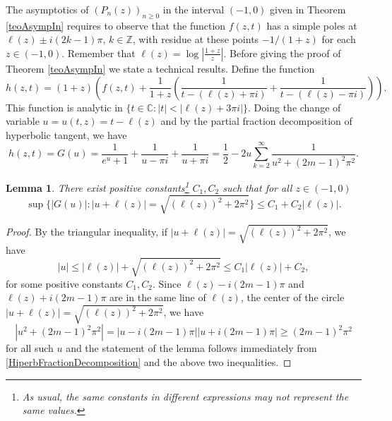\documentclass[11pt]{article}
\newtheorem{lemma}{Lemma}
\newcommand{\Z}{\mathbb{Z}}
\newcommand{\C}{\mathbb{C}}
\begin{document}
The asymptotics of $(P_n(z))_{n\ge 0}$ in the interval $(-1,0)$ given in Theorem \ref{teoAsympIn} requires to observe that the function $f(z,t)$ has a simple poles at $\ell(z)\pm i(2k-1)\pi$, $k\in\Z$, with residue at these points $-1/(1+z)$ for each $z\in (-1,0)$. Remember that $\ell(z)=\log|\frac{1+z}{z}|$. Before giving the proof of Theorem \ref{teoAsympIn} we  state a technical results. Define the function
\[
h(z,t)=(1+z)\left(f(z,t)+\frac{1}{1+z}\left(\frac{1}{t-(\ell(z)+\pi i)}+\frac{1}{t-(\ell(z)-\pi i)}\right)\right).
\]
This function is analytic in $\{t\in\C:|t|<|\ell(z)+3\pi i|\}$. Doing the change of variable $u=u(t,z)=t-\ell(z)$ and by the partial fraction decomposition of hyperbolic tangent, we have
\begin{equation}
\label{HiperbFractionDecomposition}
h(z,t)=G(u)=\frac{1}{e^u+1}+\frac{1}{u-\pi i}+\frac{1}{u+\pi i}=\frac12-2u\sum_{k=2}^\infty\frac{1}{u^2+(2m-1)^2\pi^2}.
\end{equation}
\begin{lemma} \label{lemAcotaFuncSinSingularidad}There exist positive constants\footnote{As usual, the same constants in different expressions may not represent the same values. } $C_1,C_2$ such that for all $z\in(-1,0)$ 
\[
\sup\{|G(u)|:|u+\ell(z)|=\sqrt{(\ell(z))^2+2\pi^2}\}\le C_1+C_2|\ell(z)|.
\] 
\end{lemma}
\begin{proof} By the triangular inequality, if $|u+\ell(z)|=\sqrt{(\ell(z))^2+2\pi^2}$, we have
\[
|u|\le |\ell(z)|+\sqrt{(\ell(z))^2+2\pi^2}\le C_1|\ell(z)|+C_2,
\]
for some positive constants $C_1,C_2$. Since $\ell(z)-i(2m-1)\pi$ and $\ell(z)+i(2m-1)\pi$ are in the same line of $\ell(z)$, the center of the circle $|u+\ell(z)|=\sqrt{(\ell(z))^2+2\pi^2}$, we have
\[
|u^2+(2m-1)^2\pi^2|=|u-i(2m-1)\pi||u+i(2m-1)\pi|\ge(2m-1)^2\pi^2
\]
for  all such $u$ and the statement of the lemma follows immediately from \eqref{HiperbFractionDecomposition} and the above two inequalities.
\end{proof}
\end{document}
